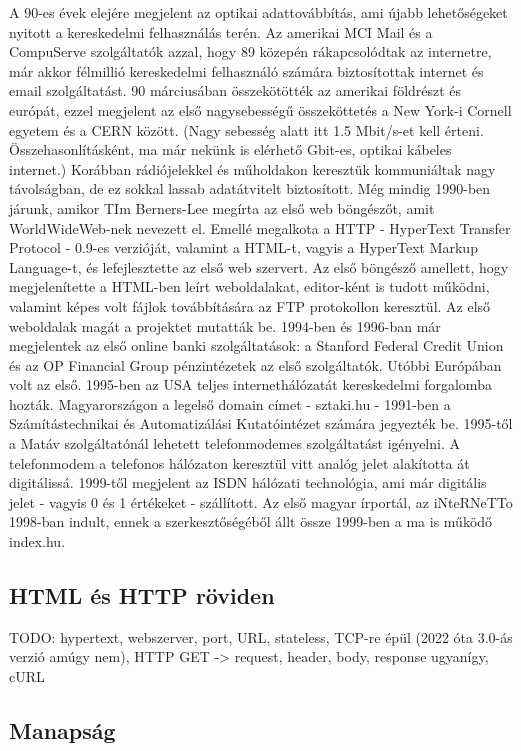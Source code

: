 \documentclass[a4paper, 12pt, oneside]{article}
\begin{document}
A 90-es évek elejére megjelent az optikai adattovábbítás, ami újabb lehetőségeket nyitott a kereskedelmi felhasználás terén. Az amerikai MCI Mail és a CompuServe szolgáltatók azzal, hogy 89 közepén rákapcsolódtak az internetre, már akkor félmillió kereskedelmi felhasználó számára biztosítottak internet és email szolgáltatást. 90 márciusában összekötötték az amerikai földrészt és európát, ezzel megjelent az első nagysebességű összeköttetés a New York-i Cornell egyetem és a CERN között. (Nagy sebesség alatt itt 1.5 Mbit/s-et kell érteni. Összehasonlításként, ma már nekünk is elérhető Gbit-es, optikai kábeles internet.) Korábban rádiójelekkel és műholdakon keresztük kommuniáltak nagy távolságban, de ez sokkal lassab adatátvitelt biztosított.
\bigbreak
Még mindig 1990-ben járunk, amikor TIm Berners-Lee megírta az első web böngészőt, amit WorldWideWeb-nek nevezett el. Emellé megalkota a HTTP - HyperText Transfer Protocol - 0.9-es verzióját, valamint a HTML-t, vagyis a HyperText Markup Language-t, és lefejlesztette az első web szervert. Az első böngésző amellett, hogy megjelenítette a HTML-ben leírt weboldalakat, editor-ként is tudott működni, valamint képes volt fájlok továbbítására az FTP protokollon keresztül. Az első weboldalak magát a projektet mutatták be. 1994-ben és 1996-ban már megjelentek az első online banki szolgáltatások: a Stanford Federal Credit Union és az OP Financial Group pénzintézetek az első szolgáltatók. Utóbbi Európában volt az első. 1995-ben az USA teljes internethálózatát kereskedelmi forgalomba hozták.
\bigbreak
Magyarországon a legelső domain címet - sztaki.hu - 1991-ben a Számítástechnikai és Automatizálási Kutatóintézet számára jegyezték be. 1995-től a Matáv szolgáltatónál lehetett telefonmodemes szolgáltatást igényelni. A telefonmodem a telefonos hálózaton keresztül vitt analóg jelet alakította át digitálissá. 1999-től megjelent az ISDN hálózati technológia, ami már digitális jelet - vagyis 0 és 1 értékeket - szállított. Az első magyar írportál, az iNteRNeTTo 1998-ban indult, ennek a szerkesztőségéből állt össze 1999-ben a ma is működő index.hu.

\subsection*{HTML és HTTP röviden}

TODO: hypertext, webszerver, port, URL, stateless, TCP-re épül (2022 óta 3.0-ás verzió amúgy nem), HTTP GET -> request, header, body, response ugyanígy, cURL

\subsection*{Manapság}
\end{document}
